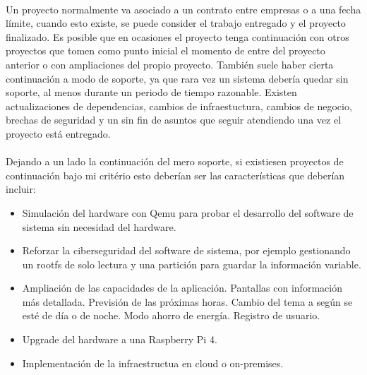 \paragraph{}Un proyecto normalmente va asociado a un contrato entre empresas o a una
fecha límite, cuando esto existe, se puede consider el trabajo entregado y el proyecto
finalizado. Es posible que en ocasiones el proyecto tenga continuación con otros proyectos
que tomen como punto inicial el momento de entre del proyecto anterior o con ampliaciones
del propio proyecto. También suele haber cierta continuación a modo de soporte, ya que
rara vez un sistema debería quedar sin soporte, al menos durante un periodo de tiempo
razonable. Existen actualizaciones de dependencias, cambios de infraestuctura, cambios
de negocio, brechas de seguridad y un sin fin de asuntos que seguir atendiendo una vez
el proyecto está entregado.

\paragraph{}Dejando a un lado la continuación del mero soporte, si existiesen proyectos
de continuación bajo mi critério esto deberían ser las características que deberían
incluir:

\begin{itemize}
    \item Simulación del hardware con Qemu para probar el desarrollo del software de
    sistema sin necesidad del hardware.
    \item Reforzar la ciberseguridad del software de sistema, por ejemplo gestionando
    un rootfs de solo lectura y una partición para guardar la información variable.
    \item Ampliación de las capacidades de la aplicación.
        \subitem Pantallas con información más detallada.
        \subitem Previsión de las próximas horas.
        \subitem Cambio del tema a según se esté de día o de noche.
        \subitem Modo ahorro de energía.
        \subitem Registro de usuario.
    \item Upgrade del hardware a una Raspberry Pi 4.
    \item Implementación de la infraestructua en cloud o on-premises.

\end{itemize}


